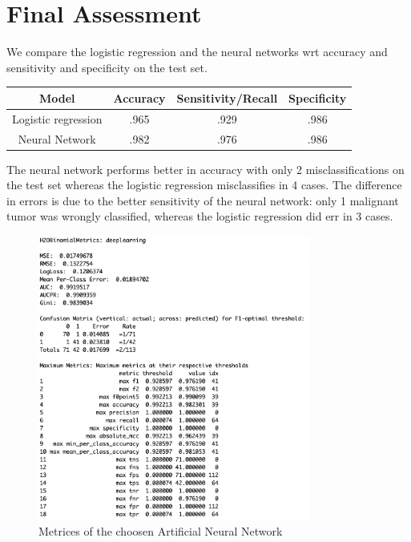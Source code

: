 \documentclass[]{article}
\begin{document}
\section{Final Assessment}\label{final-assessment}

We compare the logistic regression and the neural networks wrt accuracy
and sensitivity and specificity on the test set.

\begin{center}
 \begin{tabular}{|c | c |  c | c|} 
 \hline
 Model & Accuracy & Sensitivity/Recall & Specificity \\ [0.5ex] 
 \hline
 \hline
 Logistic regression & .965 & .929 & .986 \\ 
 \hline
 Neural Network & .982 & .976 &  .986 \\
 \hline
\end{tabular}
\end{center}

The neural network performs better in accuracy with only 2
misclassifications on the test set whereas the logistic regression
misclassifies in 4 cases. The difference in errors is due to the better
sensitivity of the neural network: only 1 malignant tumor was wrongly
classified, whereas the logistic regression did err in 3 cases.

\begin{figure}
    \centering
    \includegraphics[width=0.8\textwidth]{images/h2o_model_performance.png}
    \caption{Metrices of the choosen Artificial Neural Network}
    \label{fig:h2o_model_performance}
\end{figure}
\end{document}
